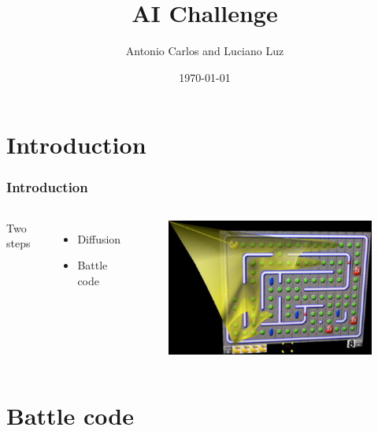 \documentclass{beamer}
\title{AI Challenge}    %
\author{Antonio Carlos and Luciano Luz}                 %
\institute{University of Alberta}      %
\date{\today}
\begin{document}
\begin{frame}
  \titlepage
\end{frame}

\section[Outline]{}

\begin{frame}
  \tableofcontents
\end{frame}

\section{Introduction}

\begin{frame}
 \frametitle{Introduction}
 \begin{columns}[c]
    \column{1.5in}
 	Two steps
 	\begin{itemize}
		\item Diffusion
		\item Battle code
	\end{itemize}
    \column{1.5in}
    \begin{figure}
     \includegraphics[scale=0.5]{pacman.jpg}
    \end{figure}

 \end{columns}
\end{frame}
  
\section{Battle code}
\end{document}
